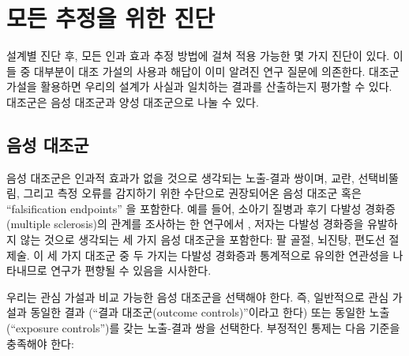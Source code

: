 \documentclass[11pt]{book}
\theoremstyle{definition}
\theoremstyle{definition}
\theoremstyle{definition}
\theoremstyle{remark}
\begin{document}
\section{모든 추정을 위한 진단}\label{---}

설계별 진단 후, 모든 인과 효과 추정 방법에 걸쳐 적용 가능한 몇 가지
진단이 있다. 이들 중 대부분이 대조 가설의 사용과 해답이 이미 알려진 연구
질문에 의존한다. 대조군 가설을 활용하면 우리의 설계가 사실과 일치하는
결과를 산출하는지 평가할 수 있다. 대조군은 음성 대조군과 양성 대조군으로
나눌 수 있다.

\subsection{음성 대조군}\label{NegativeControls}


음성 대조군은 인과적 효과가 없을 것으로 생각되는 노출-결과 쌍이며, 교란,
\citep{lipsitch_2010} 선택비뚤림, 그리고 측정 오류를 감지하기 위한
수단으로 권장되어온 음성 대조군 혹은 ``falsification endpoints''
\citep{prased_2013} 을 포함한다. \citep{arnold_2016} 예를 들어, 소아기
질병과 후기 다발성 경화증(multiple sclerosis)의 관계를 조사하는 한
연구에서 \citep{zaadstra_2008}, 저자는 다발성 경화증을 유발하지 않는
것으로 생각되는 세 가지 음성 대조군을 포함한다: 팔 골절, 뇌진탕, 편도선
절제술. 이 세 가지 대조군 중 두 가지는 다발성 경화증과 통계적으로 유의한
연관성을 나타내므로 연구가 편향될 수 있음을 시사한다.

우리는 관심 가설과 비교 가능한 음성 대조군을 선택해야 한다. 즉,
일반적으로 관심 가설과 동일한 결과 (``결과 대조군(outcome
controls)''이라고 한다) 또는 동일한 노출(``exposure controls'')를 갖는
노출-결과 쌍을 선택한다. 부정적인 통제는 다음 기준을 충족해야 한다:
\end{document}
